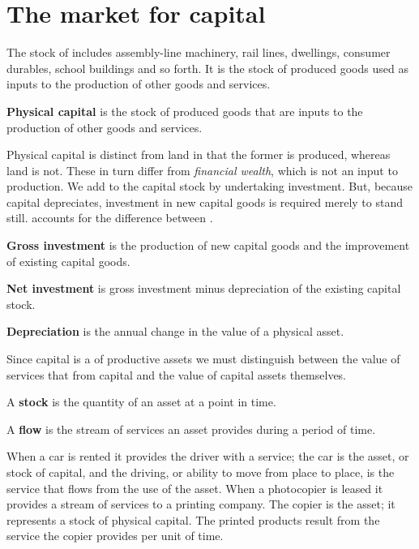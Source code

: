 \section{The market for capital}\label{sec:ch12sec5}

The stock of  includes assembly-line machinery, rail lines, dwellings, consumer durables, school buildings and so forth. It is the stock of produced goods used as inputs to the production of other goods and services.

\begin{DefBox}
\textbf{Physical capital} is the stock of produced goods that are inputs to the production of other goods and services.
\end{DefBox}

Physical capital is distinct from land in that the former is produced, whereas land is not. These in turn differ from \textit{financial wealth}, which is not an input to production. We add to the capital stock by undertaking investment. But, because capital depreciates, investment in new capital goods is required merely to stand still.  accounts for the difference between .

\begin{DefBox}
\textbf{Gross investment} is the production of new capital goods and the improvement of existing capital goods.

\textbf{Net investment} is gross investment minus depreciation of the existing capital stock.

\textbf{Depreciation} is the annual change in the value of a physical asset.
\end{DefBox}

Since capital is a  of productive assets we must distinguish between the value of services that  from capital and the value of capital assets themselves.

\begin{DefBox}
A \textbf{stock} is the quantity of an asset at a point in time.

A \textbf{flow} is the stream of services an asset provides during a period of time.
\end{DefBox}

When a car is rented it provides the driver with a service; the car is the asset, or stock of capital, and the driving, or ability to move from place to place, is the service that flows from the use of the asset. When a photocopier is leased it provides a stream of services to a printing company. The copier is the asset; it represents a stock of physical capital. The printed products result from the service the copier provides per unit of time. 

